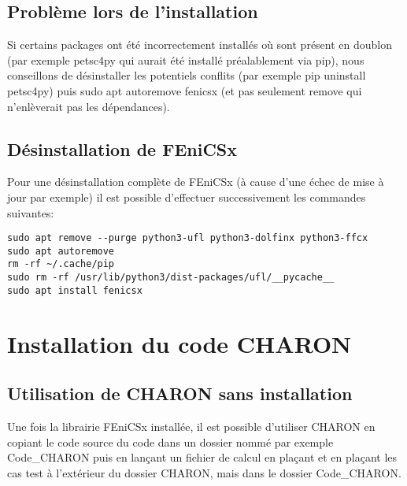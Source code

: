 \documentclass[10pt]{book}
\begin{document}
\subsection{Problème lors de l'installation}
Si certains packages ont été incorrectement installés où sont présent en doublon (par exemple petsc4py qui aurait été installé préalablement via pip), nous conseillons de désinstaller les potentiels conflits (par exemple pip uninstall petsc4py) puis sudo apt autoremove fenicsx (et pas seulement remove qui n'enlèverait pas les dépendances).
\subsection{Désinstallation de FEniCSx}
Pour une désinstallation complète de FEniCSx (à cause d'une échec de mise à jour par exemple) il est possible d'effectuer successivement les commandes suivantes:
\begin{verbatim}
sudo apt remove --purge python3-ufl python3-dolfinx python3-ffcx
sudo apt autoremove
rm -rf ~/.cache/pip
sudo rm -rf /usr/lib/python3/dist-packages/ufl/__pycache__
sudo apt install fenicsx
\end{verbatim}
\section{Installation du code CHARON}
\subsection{Utilisation de CHARON sans installation}
Une fois la librairie FEniCSx installée, il est possible d'utiliser CHARON en copiant le code source du code dans un dossier nommé par exemple Code\_CHARON puis en lançant un fichier de calcul en plaçant et en plaçant les cas test à l’extérieur du dossier CHARON, mais dans le dossier Code\_CHARON.\\
\end{document}
